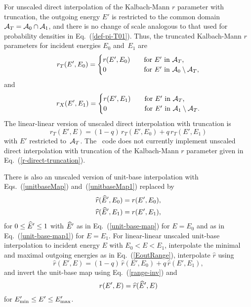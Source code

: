 For unscaled direct interpolation of the Kalbach-Mann $r$ parameter with
truncation, the outgoing energy $E'$ is restricted to the common 
domain ${\cal A}_T = {\cal A}_0 \cap {\cal A}_1$, and there is no change
of scale analogous to that used for probability densities in
Eq.~(\ref{def-pi-T01}).  Thus, the truncated Kalbach-Mann $r$ parameters
for incident energies $E_0$ and~$E_1$ are
\begin{equation*}
  r_T(E', E_0 ) = \begin{cases}
    r(E', E_0 ) &\quad \text{for $E'$ in ${\cal A}_T$,} \\
    0 &\quad \text{for $E'$ in ${\cal A}_0 \setminus {\cal A}_T$,}
  \end{cases}
\end{equation*}
and
\begin{equation*}
  r_X(E', E_1 ) = \begin{cases}
    r(E', E_1 ) &\quad \text{for $E'$ in ${\cal A}_T$,} \\
    0 &\quad \text{for $E'$ in ${\cal A}_1 \setminus {\cal A}_T$.}
  \end{cases}
\end{equation*}
The linear-linear version of unscaled direct
interpolation with truncation is
\begin{equation}
  r_T(E', E ) = ( 1 - q )\, r_T(E', E_0 ) + q\, r_T(E', E_1 )
  \label{r-direct-truncation}
\end{equation}
with $E'$ restricted to~${\cal A}_T$.
The \gettransfer\ code does not currently implement unscaled direct
interpolation with truncation of the Kalbach-Mann $r$ parameter
given in Eq.~(\ref{r-direct-truncation}).

There is also an unscaled version of unit-base interpolation with
Eqs.~(\ref{unitbaseMap}) and~(\ref{unitbaseMap1}) replaced by
\begin{equation*}
 \begin{split}
  \widehat r(\widehat E', E_0) &= r(E', E_0), \\
  \widehat r(\widehat E', E_1) &= r(E', E_1), \\
 \end{split}
\end{equation*}
for $0 \le \widehat E' \le 1$ with $\widehat E'$ as in Eq.~(\ref{unit-base-map})
for $E = E_0$ and as in Eq.~(\ref{unit-base-map1})
for $E = E_1$.  For linear-linear unscaled unit-base interpolation
to incident energy $E$ with $E_0 < E < E_1$, interpolate the
minimal and maximal outgoing energies as in Eq.~(\ref{EoutRange}),
interpolate $\widehat r$ using
$$
    \widehat r(E', E ) = ( 1 - q )\, \widehat r(E', E_0 ) + q\, \widehat r(E', E_1 ),
$$
and invert the unit-base map using Eq.~(\ref{range-inv})
and 
$$
  r(E', E) = \widehat r(\widehat E', E)
$$
for $E_{\text{min}}' \le E' \le E_{\text{max}}'$.

